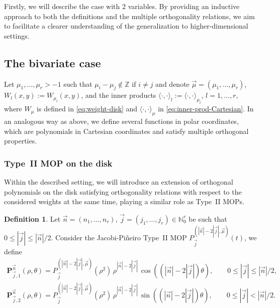 \documentclass[a4paper]{article}
\theoremstyle{plain}
\theoremstyle{definition}
\newtheorem{definition}[theorem]{Definition}
\newcommand{\NN}{\mathbb{N}}
\begin{document}
    Firstly, we will describe the case with $2$ variables. By providing an inductive approach to both the definitions and the multiple orthogonality relations, we aim to facilitate a clearer understanding of the generalization to higher-dimensional settings.
    
    \subsection{The bivariate case}\label{subsec:mop-2-vars}
    
    
    
    Let $\mu_1,\dots,\mu_r>-1$ such that $\mu_i-\mu_j\not\in\mathbb Z$ if $i\neq j$ and denote $\vec \mu =(\mu_1,\dots,\mu_r)$, $W_l(x,y) := W_{\mu_l}(x,y)$, and the inner products $\langle\cdot,\cdot\rangle_l := \langle\cdot,\cdot\rangle_{\mu_l}$, $l=1,\dots,r$, where $W_\mu$ is defined in \eqref{eq:weight-disk} and $\langle\cdot,\cdot\rangle_{\mu}$ in \eqref{eq:inner-prod-Cartesian}. In an analogous way as above, we define several functions in polar coordinates, which are polynomials in Cartesian coordinates and satisfy multiple orthogonal properties.
    
    \subsubsection{Type~II MOP on the disk}\label{subsec:type-ii-disk}

    Within the described setting, we will introduce an extension of orthogonal polynomials on the disk satisfying orthogonality relations with respect to the considered weights at the same time, playing a similar role as Type~II MOPs.

    \begin{definition}
    \label{def:MOP-2-vars}
        Let $\vec n = (n_1,\dots,n_r),\, \vec j = (j_1,\dots,j_r)\in\NN_0^r$ be such that $0\leq |\vec j| \leq |\vec n|/2$. Consider the Jacobi-Pi\~neiro Type~II MOP $P^{(|\vec n|-2|\vec j|, \vec \mu)}_{\vec j}(t)$, we define
        \begin{equation}
        \label{eq:mop-disk}
            \begin{array}{c}
            \mathbf P_{\vec j,1}^{\vec n}(\rho,\theta) =P^{(|\vec n|-2|\vec j|, \vec \mu)}_{\vec j}(\rho^2)\, \rho^{|\vec n|-2|\vec j|}\,\cos((|\vec n|-2|\vec j|)\theta), \qquad 0\leq |\vec j| \leq |\vec n|/2,
            \\[2ex]
            \mathbf P_{\vec j,2}^{\vec n}(\rho,\theta) = P^{(|\vec n|-2|\vec j|, \vec \mu)}_{\vec j}(\rho^2)\, \rho^{|\vec n|-2|\vec j|}\,\sin((|\vec n|-2|\vec j|)\theta), \qquad 0\leq |\vec j|< |\vec n|/2.
            \end{array}
        \end{equation}
    \end{definition}
    
\end{document}
